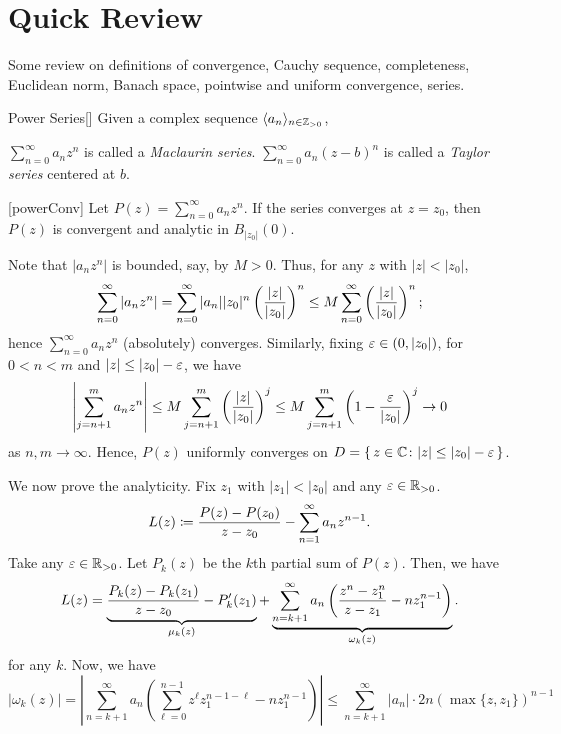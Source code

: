 \documentclass[../complex_variables_1.tex]{subfiles}
\begin{document}
\section{Quick Review}

Some review on definitions of convergence, Cauchy sequence, completeness, Euclidean norm,
Banach space, pointwise and uniform convergence, series.

\begin{Definition}{Power Series}[]
    Given a complex sequence \(\lang a_n \rang_{n \in \ZZ_{>0}}\),
    \begin{enumerate}[label=(\roman*)]
        \ii
        \(\sum_{n=0}^\infty a_n z^n\) is called a \emph{Maclaurin series}.
        \ii
        \(\sum_{n=0}^\infty a_n (z-b)^n\) is called a \emph{Taylor series} centered at \(b\).
    \end{enumerate}
\end{Definition}

\begin{Theorem}{}[powerConv]
    Let \(P(z) = \sum_{n=0}^\infty a_nz^n\).
    If the series converges at \(z = z_0\), then \(P(z)\) is convergent and analytic in \(B_{|z_0|}(0)\).
\end{Theorem}
\begin{myproof}[Proof]
    Note that \(|a_nz^n|\) is bounded, say, by \(M > 0\).
    Thus, for any \(z\) with \(|z| < |z_0|\),
    \[
        \sum_{n=0}^\infty |a_nz^n|
        = \sum_{n=0}^\infty |a_n| |z_0|^n \left( \frac{|z|}{|z_0|} \right)^n
        \le M \sum_{n=0}^\infty \left( \frac{|z|}{|z_0|} \right)^n\text;
    \]
    hence \(\sum_{n=0}^\infty a_nz^n\) (absolutely) converges.
    Similarly, fixing \(\varepsilon \in (0, |z_0|)\), for \(0 < n < m\) and \(|z| \le |z_0| - \varepsilon\), we have
    \[
        \left| \sum_{j=n+1}^m a_nz^n \right|
        \le M \sum_{j=n+1}^m \left( \frac{|z|}{|z_0|} \right)^j
        \le M \sum_{j=n+1}^m \left( 1- \frac{\varepsilon}{|z_0|} \right)^j \to 0
    \]
    as \(n, m \to \infty\). Hence, \(P(z)\) uniformly converges on
    \(D = \{\,z \in \CC \colon |z| \le |z_0| - \veps\,\}\).

    We now prove the analyticity.
    Fix \(z_1\) with \(|z_1| < |z_0|\) and any \(\veps \in \RR_{>0}\).
    \[
        L(z) \coloneqq \frac{P(z)-P(z_0)}{z-z_0} - \sum_{n=1}^\infty a_nz^{n-1}\text.
    \]
    Take any \(\veps \in \RR_{>0}\).
    Let \(P_k(z)\) be the \(k\)th partial sum of \(P(z)\).
    Then, we have
    \[
        L(z) = \underbrace{\frac{P_k(z) - P_k(z_1)}{z - z_0} - P_k'(z_1)}_{\mu_k(z)}
        + \underbrace{\sum_{n=k+1}^\infty a_n \left( \frac{z^n-z_1^n}{z-z_1} - nz_1^{n-1} \right)}_{\omega_k(z)}\text.
    \]
    for any \(k\).
    Now, we have
    \[
        |\omega_k(z)|
        = \left| \sum_{n=k+1}^\infty a_n \left( \sum_{\ell=0}^{n-1}z^{\ell} z_1^{n-1-\ell} - nz_1^{n-1} \right) \right|
        \le \sum_{n=k+1}^\infty |a_n| \cdot 2n(\max \{z, z_1\})^{n-1}
    \]
\end{myproof}
\end{document}
